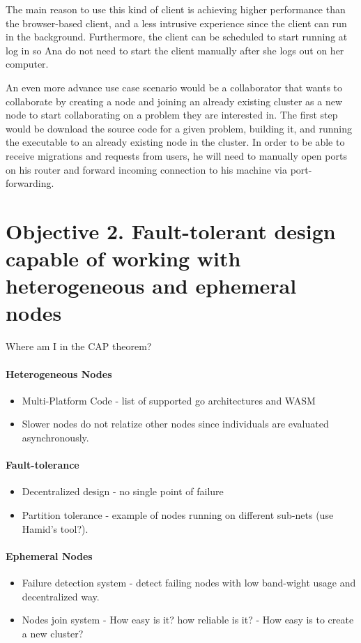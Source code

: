 The main reason to use this kind of client is achieving higher performance than the browser-based client, and a less intrusive experience since the client can run in the background. Furthermore, the client can be scheduled to start running at log in so Ana do not need to start the client manually after she logs out on her computer.

An even more advance use case scenario would be a collaborator that wants to collaborate by creating a node and joining an already existing cluster as a new node to start collaborating on a problem they are interested in. The first step would be download the source code for a given problem, building it, and running the executable to an already existing node in the cluster. In order to be able to receive migrations and requests from users, he will need to manually open ports on his router and forward incoming connection to his machine via port-forwarding.


\section{Objective 2. Fault-tolerant design capable of working with heterogeneous and ephemeral nodes}

Where am I in the CAP theorem?

\paragraph*{Heterogeneous Nodes}
\begin{itemize}
	\item Multi-Platform Code - list of supported go architectures and WASM
	\item Slower nodes do not relatize other nodes since individuals are evaluated asynchronously.
\end{itemize}

\paragraph*{Fault-tolerance}
\begin{itemize}
	\item Decentralized design - no single point of failure
	\item Partition tolerance - example of nodes running on different sub-nets (use Hamid's tool?).
\end{itemize}

\paragraph*{Ephemeral Nodes}
\begin{itemize}
	\item Failure detection system - detect failing nodes with low band-wight usage and decentralized way.
	\item Nodes join system - How easy is it? how reliable is it? - How easy is to create a new cluster?
\end{itemize}

